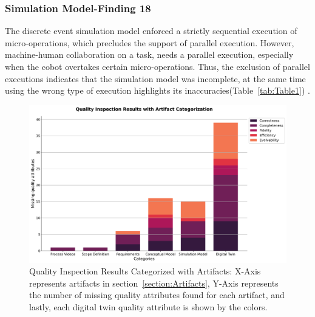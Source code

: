 \documentclass{llncs}
\begin{document}
    \subsubsection{Simulation Model-Finding 18 }
        The discrete event simulation model enforced a strictly sequential execution of micro-operations,
        which precludes the support of parallel execution. 
        However, machine-human collaboration on a task, needs a parallel execution, especially when the cobot overtakes certain micro-operations. 
        Thus, the exclusion of parallel executions indicates that the simulation model was incomplete,
        at the same time using the wrong type of execution highlights its inaccuracies(Table~\ref{tab:Table1}) .
    
    \begin{figure}[htbp]
            \centering
            \includegraphics[scale = 0.35]{quality_inspection_results_with_artifacts.png}
            \caption{Quality Inspection Results Categorized with Artifacts: X-Axis represents artifacts in section~\ref{section:Artifacts}, 
            Y-Axis represents the number of missing quality attributes found for each artifact, 
            and lastly, each digital twin quality attribute is shown by the colors.}
            \label{fig:QualityInspectonResultsWithArtifacts}
    \end{figure}
\end{document}
